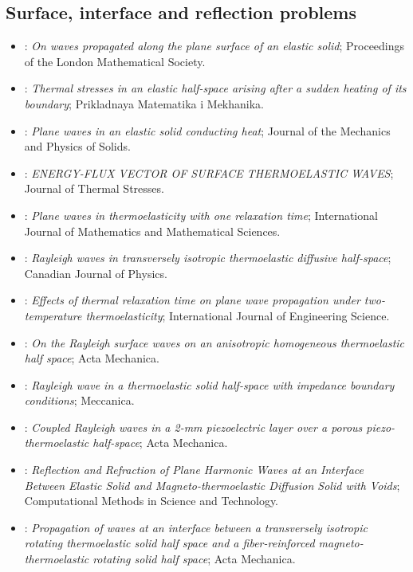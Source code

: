 \subsection{Surface, interface and reflection problems}
\begin{itemize}\itemsep0pt\small
\item \citet{Rayleigh1885}: \emph{On waves propagated along the plane surface of an elastic solid}; Proceedings of the London Mathematical Society.
\item \citet{Danilovskaya1950}: \emph{Thermal stresses in an elastic half-space arising after a sudden heating of its boundary}; Prikladnaya Matematika i Mekhanika.
\item \citet{ChadwickSneddon1958}: \emph{Plane waves in an elastic solid conducting heat}; Journal of the Mechanics and Physics of Solids.
\item \citet{IvanovSavova1991}: \emph{ENERGY-FLUX VECTOR OF SURFACE THERMOELASTIC WAVES}; Journal of Thermal Stresses.
\item \citet{Wang2001}: \emph{Plane waves in thermoelasticity with one relaxation time}; International Journal of Mathematics and Mathematical Sciences.
\item \citet{Kumar2008a}: \emph{Rayleigh waves in transversely isotropic thermoelastic diffusive half-space}; Canadian Journal of Physics.
\item \citet{Kumar2010}: \emph{Effects of thermal relaxation time on plane wave propagation under two-temperature thermoelasticity}; International Journal of Engineering Science.
\item \citet{Chirita2012}: \emph{On the Rayleigh surface waves on an anisotropic homogeneous thermoelastic half space}; Acta Mechanica.
\item \citet{Singh2015}: \emph{Rayleigh wave in a thermoelastic solid half-space with impedance boundary conditions}; Meccanica.
\item \citet{Vashishth2016}: \emph{Coupled Rayleigh waves in a 2-mm piezoelectric layer over a porous piezo-thermoelastic half-space}; Acta Mechanica.
\item \citet{KumarKansal2017}: \emph{Reflection and Refraction of Plane Harmonic Waves at an Interface Between Elastic Solid and Magneto-thermoelastic Diffusion Solid with Voids}; Computational Methods in Science and Technology.
\item \citet{Deswal2019}: \emph{Propagation of waves at an interface between a transversely isotropic rotating thermoelastic solid half space and a fiber-reinforced magneto-thermoelastic rotating solid half space}; Acta Mechanica.

\end{itemize}
